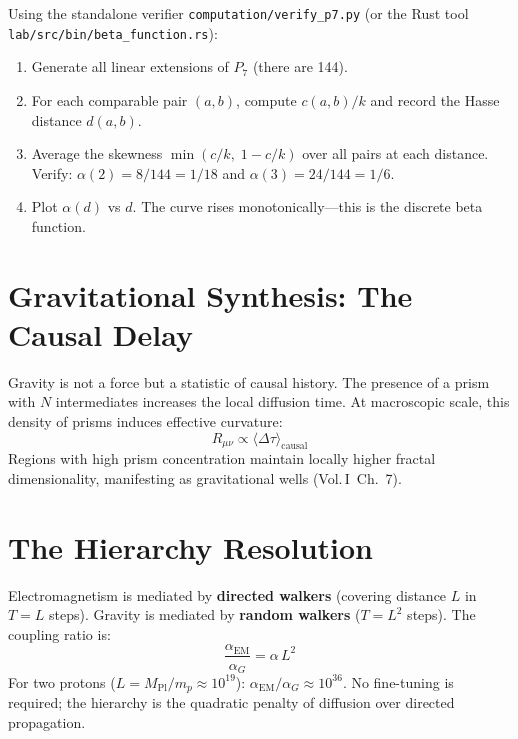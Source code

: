 \documentclass[11pt, a4paper, openany]{book}
\newcommand{\MPl}{M_{\mathrm{Pl}}}
\newcommand{\VolI}[1]{\textnormal{(Vol.\,I~#1)}}
\newcounter{thm}[chapter]
\begin{document}
\begin{simulation}
Using the standalone verifier \texttt{computation/verify\_p7.py}
(or the Rust tool \texttt{lab/src/bin/beta\_function.rs}):
\begin{enumerate}
\item Generate all linear extensions of $P_7$ (there are 144).
\item For each comparable pair $(a,b)$, compute $c(a,b)/k$ and
  record the Hasse distance $d(a,b)$.
\item Average the skewness $\min(c/k,\; 1 - c/k)$ over all pairs at
  each distance.  Verify: $\alpha(2) = 8/144 = 1/18$ and
  $\alpha(3) = 24/144 = 1/6$.
\item Plot $\alpha(d)$ vs $d$.  The curve rises monotonically---this
  is the discrete beta function.
\end{enumerate}
\end{simulation}

\section{Gravitational Synthesis: The Causal Delay}\label{sec:gravity}

Gravity is not a force but a statistic of causal history. The presence of a prism with $N$ intermediates increases the local diffusion time. At macroscopic scale, this density of prisms induces effective curvature:
\[
  R_{\mu\nu} \propto \langle\Delta\tau\rangle_{\mathrm{causal}}
\]
Regions with high prism concentration maintain locally higher fractal dimensionality, manifesting as gravitational wells \VolI{Ch.~7}.

\section{The Hierarchy Resolution}\label{sec:hierarchy}

\begin{theorem}\label{thm:hierarchy}
Electromagnetism is mediated by \textbf{directed walkers} (covering distance $L$ in $T = L$ steps). Gravity is mediated by \textbf{random walkers} ($T = L^2$ steps). The coupling ratio is:
\[
  \frac{\alpha_{\mathrm{EM}}}{\alpha_G} = \alpha\,L^2
\]
For two protons ($L = \MPl/m_p \approx 10^{19}$): $\alpha_{\mathrm{EM}}/\alpha_G \approx 10^{36}$. No fine-tuning is required; the hierarchy is the quadratic penalty of diffusion over directed propagation.
\end{theorem}
\end{document}

